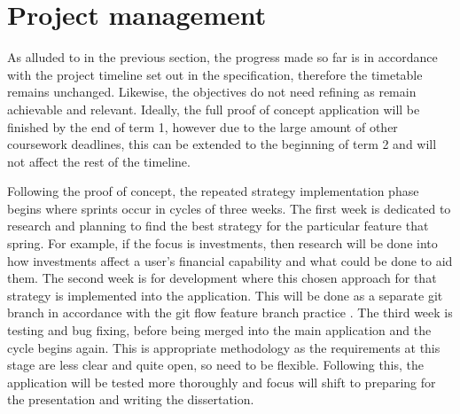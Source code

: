 \section{Project management}

As alluded to in the previous section, the progress made so far is in accordance with the project timeline set out in the specification, therefore the timetable remains unchanged. Likewise, the objectives do not need refining as remain achievable and relevant. Ideally, the full proof of concept application will be finished by the end of term 1, however due to the large amount of other coursework deadlines, this can be extended to the beginning of term 2 and will not affect the rest of the timeline.

Following the proof of concept, the repeated strategy implementation phase begins where sprints occur in cycles of three weeks. The first week is dedicated to research and planning to find the best strategy for the particular feature that spring. For example, if the focus is investments, then research will be done into how investments affect a user's financial capability and what could be done to aid them. The second week is for development where this chosen approach for that strategy is implemented into the application. This will be done as a separate git branch in accordance with the git flow feature branch practice \cite{GitFlow}. The third week is testing and bug fixing, before being merged into the main application and the cycle begins again. This is appropriate methodology as the requirements at this stage are less clear and quite open, so need to be flexible. Following this, the application will be tested more thoroughly and focus will shift to preparing for the presentation and writing the dissertation.
